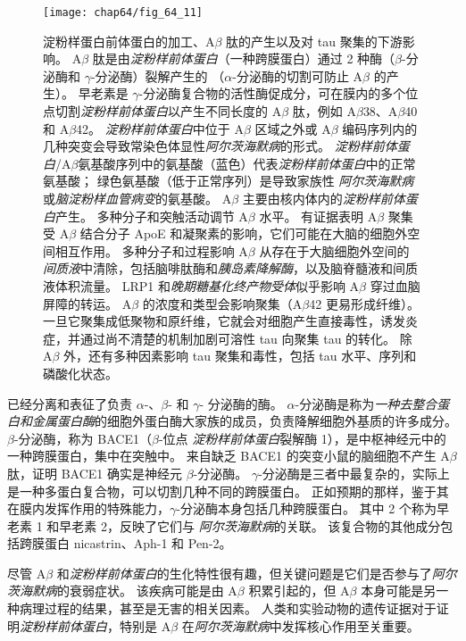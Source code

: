 \begin{figure}[htbp]
	\centering
	\texttt{[image: chap64/fig\_64\_11]}
	\caption{淀粉样蛋白前体蛋白的加工、A$\beta$ 肽的产生以及对 tau 聚集的下游影响。
		A$\beta$ 肽是由\textit{淀粉样前体蛋白}（一种跨膜蛋白）通过 2 种酶（$\beta$-分泌酶和 $\gamma$-分泌酶）裂解产生的
		（$\alpha$-分泌酶的切割可防止 A$\beta$ 的产生）。
		早老素是 $\gamma$-分泌酶复合物的活性酶促成分，可在膜内的多个位点切割\textit{淀粉样前体蛋白}以产生不同长度的 A$\beta$ 肽，例如 A$\beta$38、A$\beta$40 和 A$\beta$42。
		\textit{淀粉样前体蛋白}中位于 A$\beta$ 区域之外或 A$\beta$ 编码序列内的几种突变会导致常染色体显性\textit{阿尔茨海默病}的形式。 
		\textit{淀粉样前体蛋白}/A$\beta$氨基酸序列中的氨基酸（蓝色）代表\textit{淀粉样前体蛋白}中的正常氨基酸；
		绿色氨基酸（低于正常序列）是导致家族性 \textit{阿尔茨海默病}或\textit{脑淀粉样血管病变}的氨基酸。
		A$\beta$ 主要由核内体内的\textit{淀粉样前体蛋白}产生。
		多种分子和突触活动调节 A$\beta$ 水平。
		有证据表明 A$\beta$ 聚集受 A$\beta$ 结合分子 ApoE 和凝聚素的影响，它们可能在大脑的细胞外空间相互作用。
		多种分子和过程影响 A$\beta$ 从存在于大脑细胞外空间的\textit{间质液}中清除，包括脑啡肽酶和\textit{胰岛素降解酶}，以及脑脊髓液和间质液体积流量。
		LRP1 和\textit{晚期糖基化终产物受体}似乎影响 A$\beta$ 穿过血脑屏障的转运。
		A$\beta$ 的浓度和类型会影响聚集（A$\beta$42 更易形成纤维）。
		一旦它聚集成低聚物和原纤维，它就会对细胞产生直接毒性，诱发炎症，并通过尚不清楚的机制加剧可溶性 tau 向聚集 tau 的转化。
		除 A$\beta$ 外，还有多种因素影响 tau 聚集和毒性，包括 tau 水平、序列和磷酸化状态。}
	\label{fig:64_11}
\end{figure}


已经分离和表征了负责 $\alpha$-、$\beta$- 和 $\gamma$- 分泌酶的酶。
$\alpha$-分泌酶是称为\textit{一种去整合蛋白和金属蛋白酶}的细胞外蛋白酶大家族的成员，负责降解细胞外基质的许多成分。
$\beta$-分泌酶，称为 BACE1（$\beta$-位点 \textit{淀粉样前体蛋白}裂解酶 1），是中枢神经元中的一种跨膜蛋白，集中在突触中。
来自缺乏 BACE1 的突变小鼠的脑细胞不产生 A$\beta$ 肽，证明 BACE1 确实是神经元 $\beta$-分泌酶。
$\gamma$-分泌酶是三者中最复杂的，实际上是一种多蛋白复合物，可以切割几种不同的跨膜蛋白。
正如预期的那样，鉴于其在膜内发挥作用的特殊能力，$\gamma$-分泌酶本身包括几种跨膜蛋白。
其中 2 个称为早老素 1 和早老素 2，反映了它们与 \textit{阿尔茨海默病}的关联。
该复合物的其他成分包括跨膜蛋白 nicastrin、Aph-1 和 Pen-2。


尽管 A$\beta$ 和\textit{淀粉样前体蛋白}的生化特性很有趣，但关键问题是它们是否参与了\textit{阿尔茨海默病}的衰弱症状。
该疾病可能是由 A$\beta$ 积累引起的，但 A$\beta$ 本身可能是另一种病理过程的结果，甚至是无害的相关因素。
人类和实验动物的遗传证据对于证明\textit{淀粉样前体蛋白}，特别是 A$\beta$ 在\textit{阿尔茨海默病}中发挥核心作用至关重要。


